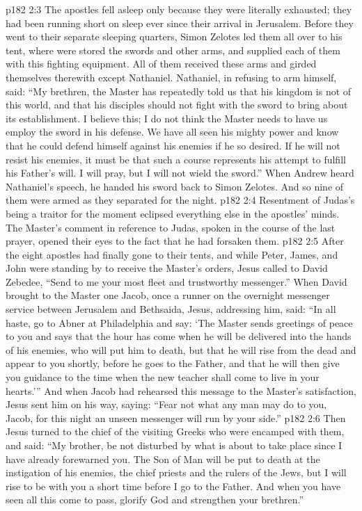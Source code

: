 \vs p182 2:3 The apostles fell asleep only because they were literally exhausted; they had been running short on sleep ever since their arrival in Jerusalem. Before they went to their separate sleeping quarters, Simon Zelotes led them all over to his tent, where were stored the swords and other arms, and supplied each of them with this fighting equipment. All of them received these arms and girded themselves therewith except Nathaniel. Nathaniel, in refusing to arm himself, said: “My brethren, the Master has repeatedly told us that his kingdom is not of this world, and that his disciples should not fight with the sword to bring about its establishment. I believe this; I do not think the Master needs to have us employ the sword in his defense. We have all seen his mighty power and know that he could defend himself against his enemies if he so desired. If he will not resist his enemies, it must be that such a course represents his attempt to fulfill his Father’s will. I will pray, but I will not wield the sword.” When Andrew heard Nathaniel’s speech, he handed his sword back to Simon Zelotes. And so nine of them were armed as they separated for the night.
\vs p182 2:4 Resentment of Judas’s being a traitor for the moment eclipsed everything else in the apostles’ minds. The Master’s comment in reference to Judas, spoken in the course of the last prayer, opened their eyes to the fact that he had forsaken them.
\pc \vs p182 2:5 After the eight apostles had finally gone to their tents, and while Peter, James, and John were standing by to receive the Master’s orders, Jesus called to David Zebedee, \textcolor{ubdarkred}{“Send to me your most fleet and trustworthy messenger.”} When David brought to the Master one Jacob, once a runner on the overnight messenger service between Jerusalem and Bethsaida, Jesus, addressing him, said: \textcolor{ubdarkred}{“In all haste, go to Abner at Philadelphia and say: ‘The Master sends greetings of peace to you and says that the hour has come when he will be delivered into the hands of his enemies, who will put him to death, but that he will rise from the dead and appear to you shortly, before he goes to the Father, and that he will then give you guidance to the time when the new teacher shall come to live in your hearts.’”} And when Jacob had rehearsed this message to the Master’s satisfaction, Jesus sent him on his way, saying: \textcolor{ubdarkred}{“Fear not what any man may do to you, Jacob, for this night an unseen messenger will run by your side.”}
\vs p182 2:6 Then Jesus turned to the chief of the visiting Greeks who were encamped with them, and said: \textcolor{ubdarkred}{“My brother, be not disturbed by what is about to take place since I have already forewarned you. The Son of Man will be put to death at the instigation of his enemies, the chief priests and the rulers of the Jews, but I will rise to be with you a short time before I go to the Father. And when you have seen all this come to pass, glorify God and strengthen your brethren.”}
